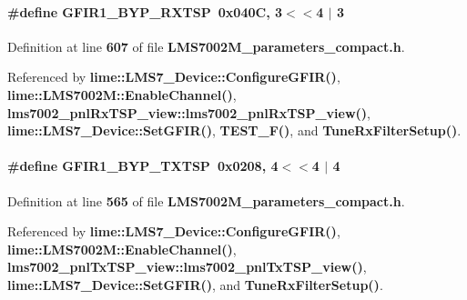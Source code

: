 \paragraph[{G\+F\+I\+R1\+\_\+\+B\+Y\+P\+\_\+\+R\+X\+T\+SP}]{\setlength{\rightskip}{0pt plus 5cm}\#define G\+F\+I\+R1\+\_\+\+B\+Y\+P\+\_\+\+R\+X\+T\+SP~0x040\+C, 3$<$$<$4 $\vert$  3}\label{LMS7002M__parameters__compact_8h_a61abff93ab1758f34931a99560494c73}


Definition at line {\bf 607} of file {\bf L\+M\+S7002\+M\+\_\+parameters\+\_\+compact.\+h}.



Referenced by {\bf lime\+::\+L\+M\+S7\+\_\+\+Device\+::\+Configure\+G\+F\+I\+R()}, {\bf lime\+::\+L\+M\+S7002\+M\+::\+Enable\+Channel()}, {\bf lms7002\+\_\+pnl\+Rx\+T\+S\+P\+\_\+view\+::lms7002\+\_\+pnl\+Rx\+T\+S\+P\+\_\+view()}, {\bf lime\+::\+L\+M\+S7\+\_\+\+Device\+::\+Set\+G\+F\+I\+R()}, {\bf T\+E\+S\+T\+\_\+\+F()}, and {\bf Tune\+Rx\+Filter\+Setup()}.

\paragraph[{G\+F\+I\+R1\+\_\+\+B\+Y\+P\+\_\+\+T\+X\+T\+SP}]{\setlength{\rightskip}{0pt plus 5cm}\#define G\+F\+I\+R1\+\_\+\+B\+Y\+P\+\_\+\+T\+X\+T\+SP~0x0208, 4$<$$<$4 $\vert$  4}\label{LMS7002M__parameters__compact_8h_aa0f5a73d40c48cb8e432e4355daab036}


Definition at line {\bf 565} of file {\bf L\+M\+S7002\+M\+\_\+parameters\+\_\+compact.\+h}.



Referenced by {\bf lime\+::\+L\+M\+S7\+\_\+\+Device\+::\+Configure\+G\+F\+I\+R()}, {\bf lime\+::\+L\+M\+S7002\+M\+::\+Enable\+Channel()}, {\bf lms7002\+\_\+pnl\+Tx\+T\+S\+P\+\_\+view\+::lms7002\+\_\+pnl\+Tx\+T\+S\+P\+\_\+view()}, {\bf lime\+::\+L\+M\+S7\+\_\+\+Device\+::\+Set\+G\+F\+I\+R()}, and {\bf Tune\+Rx\+Filter\+Setup()}.

